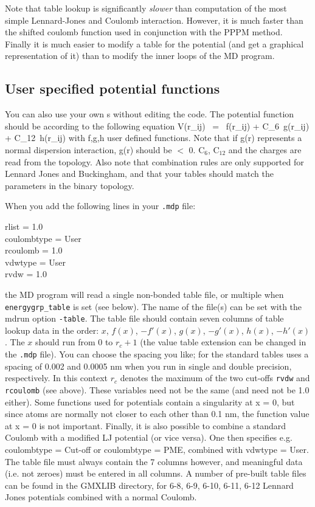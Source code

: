 Note that table lookup is significantly {\em
slower} than computation of the most simple Lennard-Jones and Coulomb
interaction. However, it is much faster than the shifted coulomb
function used in conjunction with the PPPM method. Finally it is much
easier to modify a table for the potential (and get a graphical
representation of it) than to modify the inner loops of the MD
program.

\subsection{User specified potential functions}
You can also use your own s 
without editing the {\gromacs} code. 
The potential function should be according to the following equation
\beq
V(r_{ij}) ~=~  f(r_{ij}) + C_6 \,g(r_{ij}) + C_{12} \,h(r_{ij})
\eeq
with f,g,h user defined functions. Note that if g(r) represents a
normal dispersion interaction, g(r) should be $<$ 0. C$_6$, C$_{12}$
and the charges are read from the topology. Also note that combination
rules are only supported for Lennard Jones and Buckingham, and that
your tables should match the parameters in the binary topology.

When you add the following lines in your {\tt .mdp} file:\\
\begin{tt}
rlist           = 1.0\\
coulombtype     = User\\
rcoulomb        = 1.0\\
vdwtype         = User\\
rvdw            = 1.0\\
\end{tt}
the MD program will read a single non-bonded table file,
or multiple when {\tt energygrp\_table} is set (see below).
The name of the file(s) can be set with the mdrun option {\tt -table}.
The table file should contain seven columns of table lookup data in the
order: $x$, $f(x)$, $-f'(x)$, $g(x)$, $-g'(x)$, $h(x)$, $-h'(x)$.
The $x$ should run from 0 to $r_c+1$ (the value table extension can be
changed in the {\tt .mdp} file).
You can choose the spacing you like; for the standard tables {\gromacs}
uses a spacing of 0.002 and 0.0005 nm when you run in single
and double precision, respectively.  In this
context $r_c$ denotes the maximum of the two cut-offs {\tt rvdw} and
{\tt rcoulomb} (see above). These variables need not be the same (and
need not be 1.0 either).  Some functions used for potentials contain a
singularity at x = 0, but since atoms are normally not closer to each
other than 0.1 nm, the function value at x = 0 is not important.
Finally, it is also
possible to combine a standard Coulomb with a modified LJ potential
(or vice versa). One then specifies e.g. coulombtype = Cut-off or
coulombtype = PME, combined with vdwtype = User.  The table file must
always contain the 7 columns however, and meaningful data (i.e. not
zeroes) must be entered in all columns.  A number of pre-built table
files can be found in the GMXLIB directory, for 6-8, 6-9, 6-10, 6-11, 6-12
Lennard Jones potentials combined with a normal Coulomb.

